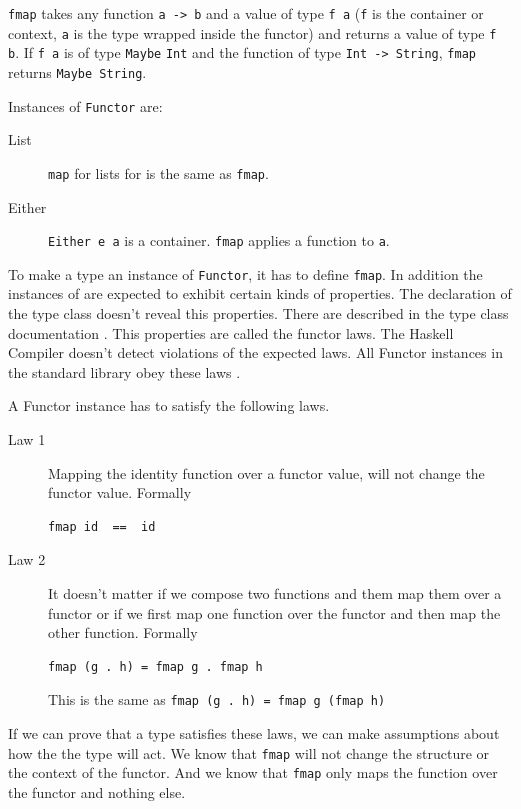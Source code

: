 \verb|fmap| takes any function \verb|a -> b| and a value of type \verb|f a| (\verb|f| is the container or context, \verb|a| is the type wrapped inside the functor) and returns a value of type \verb|f b|. 
If \verb|f a| is of type \verb|Maybe| \verb|Int| and the function of type \verb|Int -> String|, \verb|fmap| returns \verb|Maybe String|. 

Instances of \verb|Functor| are:

\begin{description}
\item[List] \verb|map| for lists for is the same as \verb|fmap|.
\item[Either] \verb|Either e a| is a container. \verb|fmap| applies a function to \verb|a|.
\end{description}

To make a type an instance of \verb|Functor|, it has to define \verb|fmap|. In addition the instances of are expected to exhibit certain kinds of properties. The declaration of the type class doesn't reveal this properties. There are described in the type class documentation \cite{data.functor} \cite{Marlow_2010}. This properties are called the functor laws.
The Haskell Compiler doesn't detect violations of the expected laws. All Functor instances in the standard library obey these laws \cite{yorgey} \cite{Lipovaca}.

A Functor instance has to satisfy the following laws.

\begin{description}
\item[Law 1] Mapping the identity function over a functor value, will not change the functor value. Formally
\begin{verbatim}
fmap id  ==  id
\end{verbatim}
\item[Law 2] It doesn't matter if we compose two functions and them map them over a functor or if we first map one function over the functor and then map the other function. Formally
\begin{verbatim}
fmap (g . h) = fmap g . fmap h
\end{verbatim}
This is the same as \verb|fmap (g . h) = fmap g (fmap h)|
\end{description}

If we can prove that a type satisfies these laws, we can make assumptions about how the the type will act. We know that \verb|fmap| will not change the structure or the context of the functor.
And we know that \verb|fmap| only maps the function over the functor and nothing else. 

